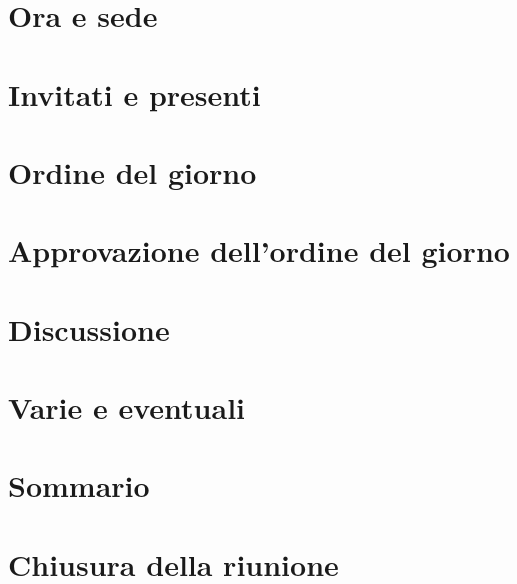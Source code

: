 \section{Ora e sede}

\section{Invitati e presenti}

\section{Ordine del giorno}

\section{Approvazione dell'ordine del giorno}

\section{Discussione}

\section{Varie e eventuali}

\section{Sommario}

\section{Chiusura della riunione}
